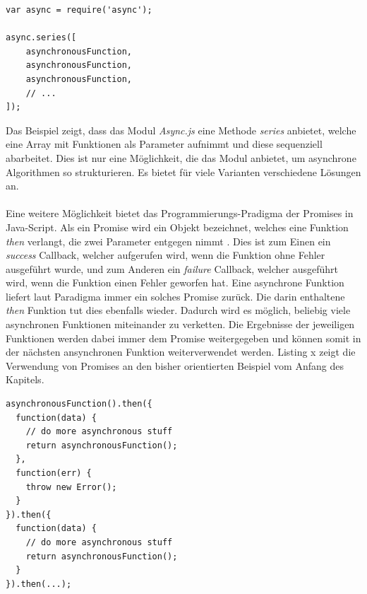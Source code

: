 \vspace{0.6cm}
\begin{lstlisting}[caption=Sequenzielle Abarbeitung von asynchronen Code durch das Async.js Module,label=asyncjs]
var async = require('async');

async.series([
    asynchronousFunction,
    asynchronousFunction,
    asynchronousFunction,
    // ...
]);
\end{lstlisting}

Das Beispiel zeigt, dass das Modul \textit{Async.js} eine Methode \textit{series} anbietet, welche eine Array mit Funktionen als Parameter aufnimmt und diese sequenziell abarbeitet. Dies ist nur eine Möglichkeit, die das Modul anbietet, um asynchrone Algorithmen so strukturieren. Es bietet für viele Varianten verschiedene Lösungen an.\\
\\
Eine weitere Möglichkeit bietet das Programmierungs-Pradigma der \glqq Promises\grqq{} in Java-Script. Als ein Promise wird ein Objekt bezeichnet, welches eine Funktion \textit{then} verlangt, die zwei Parameter entgegen nimmt \cite{promises}. Dies ist zum Einen ein \textit{success} Callback, welcher aufgerufen wird, wenn die Funktion ohne Fehler ausgeführt wurde, und zum Anderen ein \textit{failure} Callback, welcher ausgeführt wird, wenn die Funktion einen Fehler geworfen hat. Eine asynchrone Funktion liefert laut Paradigma immer ein solches Promise zurück. Die darin enthaltene \textit{then} Funktion tut dies ebenfalls wieder. Dadurch wird es möglich, beliebig viele asynchronen Funktionen miteinander zu verketten. Die Ergebnisse der jeweiligen Funktionen werden dabei immer dem Promise weitergegeben und können somit in der nächsten ansynchronen Funktion weiterverwendet werden. Listing x zeigt die Verwendung von Promises an den bisher orientierten Beispiel vom Anfang des Kapitels. 

\vspace{1.8cm}
\begin{lstlisting}[caption=Sequenzielle Abarbeitung von asynchronen Code durch das Async.js Module,label=asyncjs]
asynchronousFunction().then({
  function(data) {
    // do more asynchronous stuff
    return asynchronousFunction();
  },
  function(err) {
    throw new Error();
  }
}).then({
  function(data) {
    // do more asynchronous stuff
    return asynchronousFunction();
  }
}).then(...);
\end{lstlisting}

